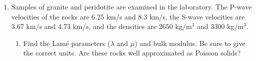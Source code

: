 \documentclass{template}
\newcommand{\solution}[1]{%
\iftoggle{showanswers}{%
\begin{solutionbox}
        #1
\end{solutionbox}%
  }{}%
}
\begin{document}
\begin{enumerate}[label=\textbf{\arabic*.}]
\begin{enumerate}[label=\Alph*)]
{}
\end{enumerate}

\item Samples of granite and peridotite are examined in the laboratory. The P-wave velocities of the rocks are 6.25 km/s and 8.3 km/s, the S-wave velocities are 3.67 km/s and 4.73 km/s, and the densities are 2650 kg/m$^3$ and 3300 kg/m$^3$.

\begin{enumerate}[label=\Alph*)]
\item Find the Lam\'e parameters ($\lambda$ and $\mu$) and bulk modulus. Be sure to give the correct units. Are these rocks well approximated as Poisson solids?
\solution{
    Using the equations for P- and S-wave velocities given during lecture:
    \begin{equation}
        V_p = \sqrt{\frac{\kappa + \frac{4}{3}\mu}{\rho}} = \sqrt{\frac{\lambda + 2\mu}{\rho}}
    \end{equation}

    \begin{equation}
        V_s = \sqrt{\frac{\mu}{\rho}}
    \end{equation}

    where:
    \begin{itemize}
        \item $\kappa$ = bulk modulus
        \item $\rho$ = density
    \end{itemize}

    The Lam\'e parameters ($\lambda$ and $\mu$) and bulk modulus for \textbf{granite} can be determined by solving first for $\mu$:

    \begin{align*}
        \mu &= V_s^2\rho\\
        &= (\qty{3670}{\m\per\s})^2(\qty{2650}{\kg\per\m\cubed})\\
        &= \boxed{\qty{35.69}{\giga\Pa}}
    \end{align*}

    Which can then be used to calculate $\lambda$:

    \begin{align*}
        \lambda &= \rho V_p^2 - 2\mu\\
        &= (\qty{2650}{\kg\per\m\cubed})(\qty{6250}{\m\per\s})^2 - 2(\qty{35.69}{\giga\Pa})\\
        &= \boxed{\qty{32.13}{\giga\Pa}}
    \end{align*}

}
\end{enumerate}
\end{enumerate}
\end{document}
